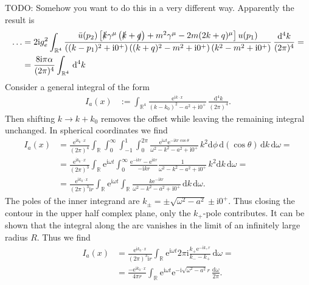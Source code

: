 \documentclass[english, parskip=full]{scrartcl}
\newcommand{\intx}{}
\newcommand{\intr}{}
\newcommand{\kla}{}
\newcommand{\klam}{}
\renewcommand{\i}{\text{i}}
\newcommand{\e}{\text{e}}
\begin{document}
TODO: Somehow you want to do this in a very different way. Apparently the result is
\begin{align}
\dots &= 2\i g_e^2 \intr\int_{\mathbb{R}^{4}} \frac{\bar{u}(p_2) \klam\left[ \slashed{k} \gamma^\mu \kla\left( \slashed{k} + \slashed{q} \right) +m^2\gamma^\mu - 2m(2k + q)^\mu  \right] u(p_1)}{\kla\left( (k - p_1)^2 + \i 0^+ \right) \kla\left( (k + q)^2 - m^2 + \i 0^+ \right) \kla\left( k^2 - m^2 + \i 0^+ \right)} \, \frac{\mathrm{d}^{4}k}{(2\pi)^4} = \\
&= \frac{8\i\pi \alpha }{(2\pi)^4} \intr\int_{\mathbb{R}^{4}}   \, \mathrm{d}^{4}k
\end{align}
Consider a general integral of the form
\begin{align}
I_a(x) &:= \intr\int_{\mathbb{R}^{4}} \frac{\e^{\i k\cdot x}}{(k - k_0)^2 - a^2 + \i 0^+} \, \frac{\mathrm{d}^{4}k}{(2\pi)^4}.
\end{align}
Then shifting $k \rightarrow k + k_0$ removes the offset while leaving the remaining integral unchanged.
In spherical coordinates we find
\begin{align}
I_a(x) &= \frac{\e^{\i k_0 \cdot x}}{(2\pi)^4}\int_{\mathbb{R}^{ }} \intx\int_{0}^{\infty} \intx\int_{-1}^{1} \intx\int_{0}^{2\pi} \frac{\e^{\i\omega t} \e^{-\i kr \cos \theta}}{\omega^2 - k^2 - a^2 + \i 0^+} \, k^2\mathrm{d}\phi\, \mathrm{d}(\cos\theta)\, \mathrm{d}k \, \mathrm{d}\omega = \\
&= \frac{\e^{\i k_0 \cdot x}}{(2\pi)^3} \intr\int_{\mathbb{R}^{ }} \e^{\i\omega t} \intx\int_{0}^{\infty} \frac{\e^{-\i kr} - \e^{\i kr} }{-\i kr} \frac{1}{\omega^2 - k^2 - a^2 + \i 0^+} \, k^2\mathrm{d}k \, \mathrm{d}\omega = \\
&= \frac{\e^{\i k_0 \cdot x}}{(2\pi)^3\i r} \intr\int_{\mathbb{R}^{ }} \e^{\i\omega t} \intr\int_{\mathbb{R}^{ }} \frac{k\e^{-\i kr}}{\omega^2 - k^2 - a^2 + \i 0^+} \, \mathrm{d}k \, \mathrm{d}\omega. 
\end{align}
The poles of the inner integrand are $k_\pm = \pm\sqrt{\omega^2 - a^2} \pm \i 0^+$.
Thus closing the contour in the upper half complex plane, only the $k_+$-pole contributes.
It can be shown that the integral along the arc vanishes in the limit of an infinitely large radius $R$.
Thus we find
\begin{align}
I_a(x) &= \frac{\e^{\i k_0 \cdot x}}{(2\pi)^3\i r} \intr\int_{\mathbb{R}^{ }} \e^{\i\omega t} 2\pi\i \frac{k_+ \e^{-\i k_+ r}}{k_- - k_+} \, \mathrm{d}\omega = \\
&= \frac{-\e^{\i k_0 \cdot x}}{4\pi r} \intr\int_{\mathbb{R}^{ }} \e^{\i\omega t} \e^{-\i \sqrt{\omega^2 - a^2} r} \, \frac{\mathrm{d}\omega}{2\pi}.
\end{align}
\end{document}
